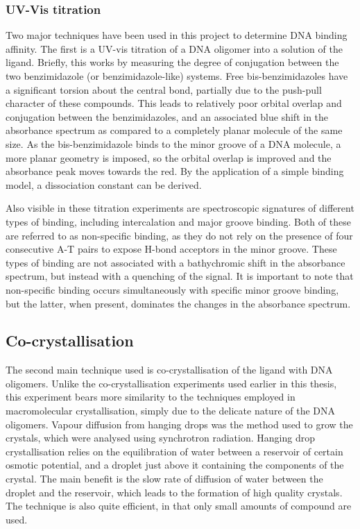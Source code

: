\begin{refsection}
\subsubsection{UV-Vis titration}
\label{sec:absorbance}
Two major techniques have been used in this project to determine DNA binding affinity.
The first is a UV-vis titration of a DNA oligomer into a solution of the ligand.
Briefly, this works by measuring the degree of conjugation between the two benzimidazole (or benzimidazole-like) systems.
Free bis-benzimidazoles have a significant torsion about the central bond, partially due to the push-pull character of these compounds.
This leads to relatively poor orbital overlap and conjugation between the benzimidazoles, and an associated blue shift in the absorbance spectrum as compared to a completely planar molecule of the same size.
As the bis-benzimidazole binds to the minor groove of a DNA molecule, a more planar geometry is imposed, so the orbital overlap is improved and the absorbance peak moves towards the red.
By the application of a simple binding model, a dissociation constant can be derived.

Also visible in these titration experiments are spectroscopic signatures of different types of binding, including intercalation and major groove binding.
Both of these are referred to as non-specific binding, as they do not rely on the presence of four consecutive A-T pairs to expose H-bond acceptors in the minor groove.
These types of binding are not associated with a bathychromic shift in the absorbance spectrum, but instead with a quenching of the signal.
It is important to note that non-specific binding occurs simultaneously with specific minor groove binding, but the latter, when present, dominates the changes in the absorbance spectrum.

\subsection{Co-crystallisation}
The second main technique used is co-crystallisation of the ligand with DNA oligomers.
Unlike the co-crystallisation experiments used earlier in this thesis, this experiment bears more similarity to the techniques employed in macromolecular crystallisation, simply due to the delicate nature of the DNA oligomers.
Vapour diffusion from hanging drops was the method used to grow the crystals, which were analysed using synchrotron radiation.
Hanging drop crystallisation relies on the equilibration of water between a reservoir of certain osmotic potential, and a droplet just above it containing the components of the crystal.
The main benefit is the slow rate of diffusion of water between the droplet and the reservoir, which leads to the formation of high quality crystals.
The technique is also quite efficient, in that only small amounts of compound are used.


\end{refsection}
